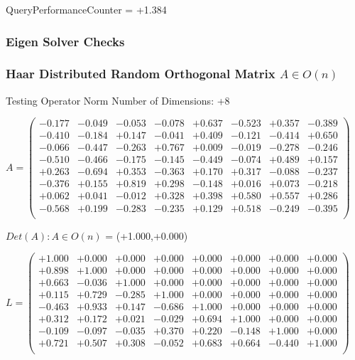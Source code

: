 \documentclass[9pt]{article}
\theoremstyle{plain}
\theoremstyle{definition}
\theoremstyle{remark}
\numberwithin{equation}{section}
\begin{document}
QueryPerformanceCounter  =  +1.384
\subsubsection{Eigen Solver Checks}
\subsubsection{Haar Distributed Random Orthogonal Matrix $A \in O(n)$}
 Testing Operator Norm
Number of Dimensions: +8

$A = \left(
\begin{array}{
cccccccc}
-0.177 & -0.049 & -0.053 & -0.078 & +0.637 & -0.523 & +0.357 & -0.389 \\
-0.410 & -0.184 & +0.147 & -0.041 & +0.409 & -0.121 & -0.414 & +0.650 \\
-0.066 & -0.447 & -0.263 & +0.767 & +0.009 & -0.019 & -0.278 & -0.246 \\
-0.510 & -0.466 & -0.175 & -0.145 & -0.449 & -0.074 & +0.489 & +0.157 \\
+0.263 & -0.694 & +0.353 & -0.363 & +0.170 & +0.317 & -0.088 & -0.237 \\
-0.376 & +0.155 & +0.819 & +0.298 & -0.148 & +0.016 & +0.073 & -0.218 \\
+0.062 & +0.041 & -0.012 & +0.328 & +0.398 & +0.580 & +0.557 & +0.286 \\
-0.568 & +0.199 & -0.283 & -0.235 & +0.129 & +0.518 & -0.249 & -0.395 \\
\end{array}
\right)$ \newline 

$Det(A) :   A \in O(n)$ = (+1.000,+0.000)

$L = \left(
\begin{array}{
cccccccc}
+1.000 & +0.000 & +0.000 & +0.000 & +0.000 & +0.000 & +0.000 & +0.000 \\
+0.898 & +1.000 & +0.000 & +0.000 & +0.000 & +0.000 & +0.000 & +0.000 \\
+0.663 & -0.036 & +1.000 & +0.000 & +0.000 & +0.000 & +0.000 & +0.000 \\
+0.115 & +0.729 & -0.285 & +1.000 & +0.000 & +0.000 & +0.000 & +0.000 \\
-0.463 & +0.933 & +0.147 & -0.686 & +1.000 & +0.000 & +0.000 & +0.000 \\
+0.312 & +0.172 & +0.021 & -0.029 & +0.694 & +1.000 & +0.000 & +0.000 \\
-0.109 & -0.097 & -0.035 & +0.370 & +0.220 & -0.148 & +1.000 & +0.000 \\
+0.721 & +0.507 & +0.308 & -0.052 & +0.683 & +0.664 & -0.440 & +1.000 \\
\end{array}
\right)$ \newline 
\end{document}
